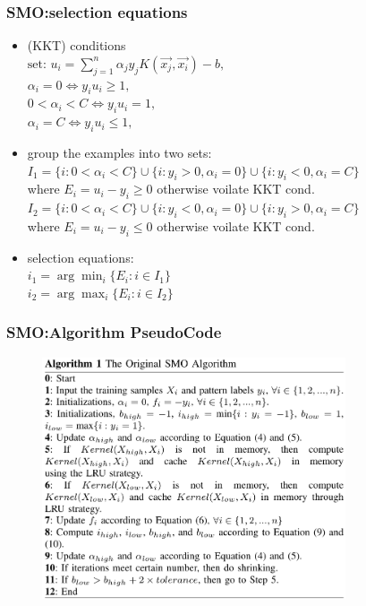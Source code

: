 \documentclass{beamer}
\begin{document}
\begin{frame}
	\frametitle{SMO:selection equations}	 

	\begin{itemize}
		\item (KKT) conditions \\
				$ \text{set: } u_i = \sum_{j=1}^{n}\alpha_jy_jK(\vec{x_j},\vec{x_i})-b,$ \\
				$ \alpha_i=0 \Leftrightarrow y_iu_i \geq 1, $ \\
				$ 0 < \alpha_i < C \Leftrightarrow y_iu_i = 1,$ \\
				$ \alpha_i=C \Leftrightarrow y_iu_i \leq 1,$
		\item group the examples into two sets: \\
				$I_1=\{i:0<\alpha_i<C\}\cup\{i:y_i>0,\alpha_i=0\}\cup\{i:y_i<0,\alpha_i=C\}$ \\
				where $E_i=u_i-y_i \geq 0$ otherwise voilate KKT cond.  \\
				
				$I_2=\{i:0<\alpha_i<C\}\cup\{i:y_i<0,\alpha_i=0\}\cup\{i:y_i>0,\alpha_i=C\}$ \\	
				where $E_i=u_i-y_i \leq 0$ otherwise voilate KKT cond.
				
		\item selection equations: \\
			$i_1 =\arg\min_{i}\{E_i:i \in I_1\}$ \\
			$i_2 =\arg\max_{i}\{E_i:i \in I_2\}$
	\end{itemize}	
\end{frame}

\begin{frame}
	\frametitle{SMO:Algorithm PseudoCode}	
	\begin{figure}
		\includegraphics[width=0.8\textwidth]{fig/smo_algo.png}
		
	\end{figure} 
\end{frame}
\end{document}
